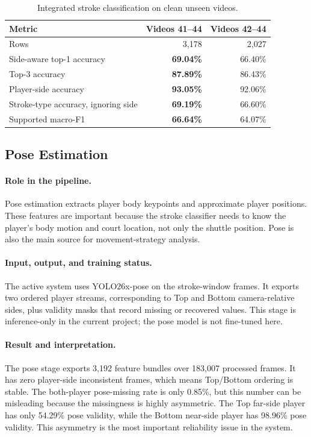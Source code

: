 \documentclass{article}
\begin{document}
\begin{table}[t]
  \caption{Integrated stroke classification on clean unseen videos.}
  \label{tab:classification}
  \centering
  \small
  \begin{tabular}{lrr}
    \toprule
    Metric & Videos 41--44 & Videos 42--44 \\
    \midrule
    Rows & 3,178 & 2,027 \\
    Side-aware top-1 accuracy & \textbf{69.04\%} & 66.40\% \\
    Top-3 accuracy & \textbf{87.89\%} & 86.43\% \\
    Player-side accuracy & \textbf{93.05\%} & 92.06\% \\
    Stroke-type accuracy, ignoring side & \textbf{69.19\%} & 66.60\% \\
    Supported macro-F1 & \textbf{66.64\%} & 64.07\% \\
    \bottomrule
  \end{tabular}
\end{table}

\subsection{Pose Estimation}

\paragraph{Role in the pipeline.}
Pose estimation extracts player body keypoints and approximate player
positions. These features are important because the stroke classifier needs to
know the player's body motion and court location, not only the shuttle
position. Pose is also the main source for movement-strategy analysis.

\paragraph{Input, output, and training status.}
The active system uses YOLO26x-pose on the stroke-window frames. It exports two
ordered player streams, corresponding to Top and Bottom camera-relative sides,
plus validity masks that record missing or recovered values. This stage is
inference-only in the current project; the pose model is not fine-tuned here.

\paragraph{Result and interpretation.}
The pose stage exports 3,192 feature bundles over 183,007 processed frames.
It has zero player-side inconsistent frames, which means Top/Bottom ordering
is stable. The both-player pose-missing rate is only 0.85\%, but this number
can be misleading because the missingness is highly asymmetric. The Top
far-side player has only 54.29\% pose validity, while the Bottom near-side
player has 98.96\% pose validity. This asymmetry is the most important
reliability issue in the system.
\end{document}
